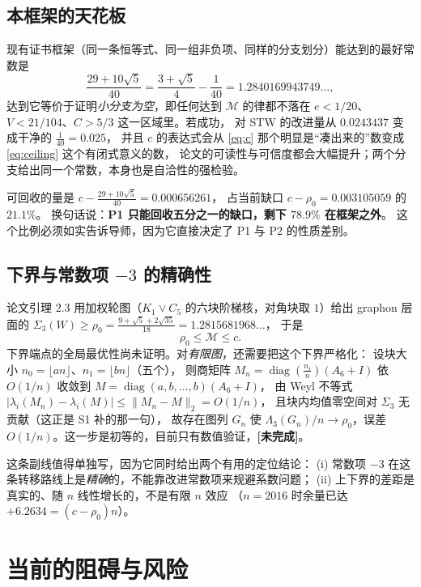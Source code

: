 \documentclass[UTF8,11pt]{ctexart}
\newcommand{\Lam}{\Lambda}
\newcommand{\M}{\mathcal{M}}
\DeclareMathOperator{\diag}{diag}
\newcommand{\todo}{\textcolor[rgb]{0.70,0.15,0.10}{\bfseries [未完成]}}
\begin{document}
\subsection{本框架的天花板}

现有证书框架（同一条恒等式、同一组非负项、同样的分支划分）能达到的最好常数是
\begin{equation}\label{eq:ceiling}
 \frac{29+10\sqrt5}{40}=\frac{3+\sqrt5}{4}-\frac1{40}=1.2840169943749\ldots ,
\end{equation}
达到它等价于证明\emph{小分支为空}，即任何达到 $\M$ 的律都不落在
$e<1/20$、$V<21/104$、$C>5/3$ 这一区域里。若成功，
对 STW 的改进量从 $0.0243437$ 变成干净的 $\frac1{40}=0.025$，
并且 $c$ 的表达式会从 \eqref{eq:c} 那个明显是``凑出来的''数变成 \eqref{eq:ceiling} 这个有闭式意义的数，
论文的可读性与可信度都会大幅提升；两个分支给出同一个常数，本身也是自洽性的强检验。

可回收的量是 $c-\frac{29+10\sqrt5}{40}=0.000656261$，
占当前缺口 $c-\rho_0=0.003105059$ 的 $21.1\%$。
换句话说：\textbf{P1 只能回收五分之一的缺口，剩下 $78.9\%$ 在框架之外}。
这个比例必须如实告诉导师，因为它直接决定了 P1 与 P2 的性质差别。

\subsection{下界与常数项 $-3$ 的精确性}\label{sec:p3}

论文引理 2.3 用加权轮图（$K_1\vee C_5$ 的六块阶梯核，对角块取 $1$）给出 graphon 层面的
$\Sigma_3(W)\ge\rho_0=\frac{9+\sqrt5+2\sqrt{35}}{18}=1.2815681968\ldots$，
于是
\[
 \rho_0\le\M\le c .
\]
下界端点的全局最优性尚未证明。对\emph{有限图}，还需要把这个下界严格化：
设块大小 $n_0=\lfloor an\rfloor$、$n_1=\lfloor bn\rfloor$（五个），
则商矩阵 $M_n=\diag(\frac{n_i}n)(A_6+I)$ 依 $O(1/n)$ 收敛到 $M=\diag(a,b,\ldots,b)(A_6+I)$，
由 Weyl 不等式 $|\lambda_i(M_n)-\lambda_i(M)|\le\|M_n-M\|_2=O(1/n)$，
且块内均值零空间对 $\Sigma_3$ 无贡献（这正是 S1 补的那一句），
故存在图列 $G_n$ 使 $\Lam_3(G_n)/n\to\rho_0$，误差 $O(1/n)$。这一步是初等的，目前只有数值验证，\todo。

这条副线值得单独写，因为它同时给出两个有用的定位结论：
(i) 常数项 $-3$ 在这条转移路线上是\emph{精确}的，不能靠改进常数项来规避系数问题；
(ii) 上下界的差距是真实的、随 $n$ 线性增长的，不是有限 $n$ 效应
（$n=2016$ 时余量已达 $+6.2634=(c-\rho_0)n$）。

\section{当前的阻碍与风险}
\end{document}
